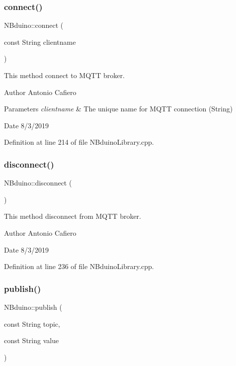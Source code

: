 \subsubsection{\texorpdfstring{connect()}{connect()}}
{\footnotesize\ttfamily N\+Bduino\+::connect (\begin{DoxyParamCaption}\item[{const String}]{clientname }\end{DoxyParamCaption})}

This method connect to M\+Q\+TT broker. \begin{DoxyAuthor}{Author}
Antonio Cafiero 
\end{DoxyAuthor}

\begin{DoxyParams}{Parameters}
{\em clientname} & The unique name for M\+Q\+TT connection (String) \\
\hline
\end{DoxyParams}
\begin{DoxyDate}{Date}
8/3/2019 
\end{DoxyDate}


Definition at line 214 of file N\+Bduino\+Library.\+cpp.

\mbox{\label{class_n_bduino_ae013d9c6d18771efa34f9805039a0127}} 
\subsubsection{\texorpdfstring{disconnect()}{disconnect()}}
{\footnotesize\ttfamily N\+Bduino\+::disconnect (\begin{DoxyParamCaption}{ }\end{DoxyParamCaption})}

This method disconnect from M\+Q\+TT broker. \begin{DoxyAuthor}{Author}
Antonio Cafiero 
\end{DoxyAuthor}
\begin{DoxyDate}{Date}
8/3/2019 
\end{DoxyDate}


Definition at line 236 of file N\+Bduino\+Library.\+cpp.

\mbox{\label{class_n_bduino_a1c9526fbb36956b1cd41e33dd9133394}} 
\subsubsection{\texorpdfstring{publish()}{publish()}}
{\footnotesize\ttfamily N\+Bduino\+::publish (\begin{DoxyParamCaption}\item[{const String}]{topic,  }\item[{const String}]{value }\end{DoxyParamCaption})}

